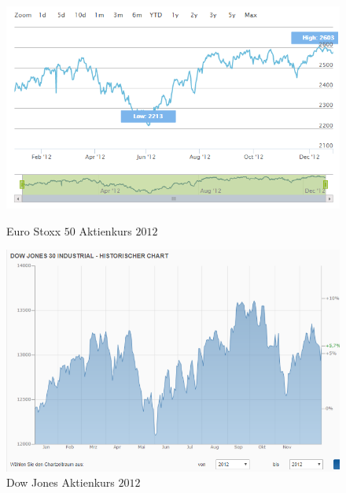  \begin{figure}[H]
 \begin{minipage}[b]{.4\linewidth} %
 	\includegraphics[width=1\textwidth]{Pictures/EuroxStoxx.png}
 	\caption{Euro Stoxx $50$ Aktienkurs $2012$} \label{eustoxx}
 \end{minipage}
 \hspace{.1\linewidth}%
 \begin{minipage}[b]{.4\linewidth} %
 	\includegraphics[width=1\textwidth]{Pictures/DowJones2012.png}
 	\caption{Dow Jones Aktienkurs $2012$}\label{dowjones}
 \end{minipage}
\end{figure}
